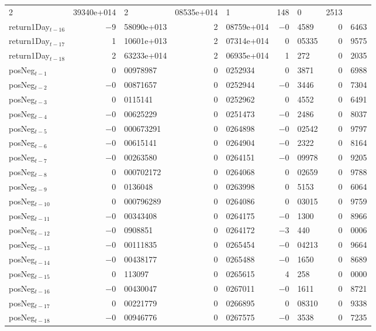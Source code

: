 \begin{center}
\begin{tabular}{lr@{.}lr@{.}lr@{.}lr@{.}l}
    2&39340\textrm{e+014} &
    2&08535\textrm{e+014} &
        1&148 &
        0&2513 \\
return1Day$_{t-16}$ &
    $-$9&58090\textrm{e+013} &
    2&08759\textrm{e+014} &
        $-$0&4589 &
        0&6463 \\
return1Day$_{t-17}$ &
    1&10601\textrm{e+013} &
    2&07314\textrm{e+014} &
        0&05335 &
        0&9575 \\
return1Day$_{t-18}$ &
    2&63233\textrm{e+014} &
    2&06935\textrm{e+014} &
        1&272 &
        0&2035 \\
posNeg$_{t-1}$ &
    0&00978987 &
    0&0252934 &
        0&3871 &
        0&6988 \\
posNeg$_{t-2}$ &
    $-$0&00871657 &
    0&0252944 &
        $-$0&3446 &
        0&7304 \\
posNeg$_{t-3}$ &
    0&0115141 &
    0&0252962 &
        0&4552 &
        0&6491 \\
posNeg$_{t-4}$ &
    $-$0&00625229 &
    0&0251473 &
        $-$0&2486 &
        0&8037 \\
posNeg$_{t-5}$ &
    $-$0&000673291 &
    0&0264898 &
        $-$0&02542 &
        0&9797 \\
posNeg$_{t-6}$ &
    $-$0&00615141 &
    0&0264904 &
        $-$0&2322 &
        0&8164 \\
posNeg$_{t-7}$ &
    $-$0&00263580 &
    0&0264151 &
        $-$0&09978 &
        0&9205 \\
posNeg$_{t-8}$ &
    0&000702172 &
    0&0264068 &
        0&02659 &
        0&9788 \\
posNeg$_{t-9}$ &
    0&0136048 &
    0&0263998 &
        0&5153 &
        0&6064 \\
posNeg$_{t-10}$ &
    0&000796289 &
    0&0264086 &
        0&03015 &
        0&9759 \\
posNeg$_{t-11}$ &
    $-$0&00343408 &
    0&0264175 &
        $-$0&1300 &
        0&8966 \\
posNeg$_{t-12}$ &
    $-$0&0908851 &
    0&0264172 &
        $-$3&440 &
        0&0006 \\
posNeg$_{t-13}$ &
    $-$0&00111835 &
    0&0265454 &
        $-$0&04213 &
        0&9664 \\
posNeg$_{t-14}$ &
    $-$0&00438177 &
    0&0265488 &
        $-$0&1650 &
        0&8689 \\
posNeg$_{t-15}$ &
    0&113097 &
    0&0265615 &
        4&258 &
        0&0000 \\
posNeg$_{t-16}$ &
    $-$0&00430047 &
    0&0267011 &
        $-$0&1611 &
        0&8721 \\
posNeg$_{t-17}$ &
    0&00221779 &
    0&0266895 &
        0&08310 &
        0&9338 \\
posNeg$_{t-18}$ &
    $-$0&00946776 &
    0&0267575 &
        $-$0&3538 &
        0&7235 \\
\end{tabular}


\end{center}
